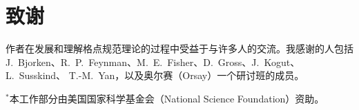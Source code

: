 \section*{致谢}

作者在发展和理解格点规范理论的过程中受益于与许多人的交流。我感谢的人包括
J.~Bjorken、R.~P.~Feynman、M.~E.~Fisher、D.~Gross、J.~Kogut、L.~Susskind、
T.-M.~Yan，以及奥尔赛（Orsay）一个研讨班的成员。

\vspace{4mm}

\begin{center}
\footnotesize
\begin{minipage}{0.93\textwidth}
\raggedright
${}^{*}$本工作部分由美国国家科学基金会（National Science Foundation）资助。


\end{minipage}
\end{center}
